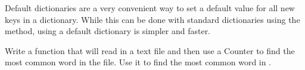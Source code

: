 Default dictionaries are a very convenient way to set a default value for all new keys in a dictionary.
While this can be done with standard dictionaries using the  method, using a default dictionary is simpler and faster.

\begin{problem}
Write a function that will read in a text file and then use a Counter to find the most common word in the file. Use it to find the most common word in .

\end{problem}


\begin{comment}
\begin{problem}
Write a function that takes in an integer maxInt and a integer n. Make a list of random integers between  0 and maxInt of length n, then use the Counter class to count how many there are of each one. Return a dictionary where the keys are the integers in the list and values are the frequency of the integer.
\end{problem}


 are named tuples and deques.

Named tuples are designed to help improve code readability in some cases.
Standard tuples in Python are accessed by index.
Named tuples allow access via index or by a field name.
Compare the following:
\begin{lstlisting}
from collections import namedtuple
pt = (32.1, 63.2)

Pt = namedtuple(`Point', `x y')
npt = Pt(32.1, 63.2)
\end{lstlisting}
The tuple \li{pt} is a standard tuple, which we can surmise represents the coordinates of a pt in 2D space.
We must assume that \li{pt[0]} is the x-coordinate and \li{pt[1]} is the y-coordinate.
When declaring a named tuple, we clearly defined what each index represents.
We know for certain that \li{npt.x} is the x-coordinate and that \li{npt.y} is the y-coordinate.


\begin{problem}
A double-ended queue, or deque, can be thought of as a deck of cards.
Inserting and removing elements from either end is very efficient.
Python's deque implementation only allows insertions at the left and right ends of the data structure.
This differs from a list, which allows insertions anywhere, but is very inefficient for all but right end insertions.
Write two functions that will rotate the elements of a deque and a list respectively.
To rotate, remove elements from the right end one by one and insert them on the left end.
Compare the timings you obtain from a deque and a list of 10000 elements.
\end{problem}
\end{comment}
